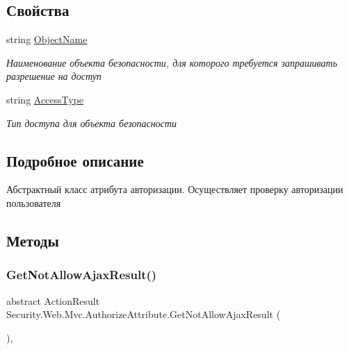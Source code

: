 \subsection*{Свойства}
\begin{DoxyCompactItemize}
\item 
string \hyperlink{class_security_1_1_web_1_1_mvc_1_1_authorize_attribute_a40d355c64a1d66cbab8b54f1fb67ad4f}{Object\+Name}
\begin{DoxyCompactList}\small\item\em Наименование объекта безопасности, для которого требуется запрашивать разрешение на доступ \end{DoxyCompactList}\item 
string \hyperlink{class_security_1_1_web_1_1_mvc_1_1_authorize_attribute_a7bc431c58d3c8410ba8d3e32972eca39}{Access\+Type}
\begin{DoxyCompactList}\small\item\em Тип доступа для объекта безопасности \end{DoxyCompactList}\end{DoxyCompactItemize}


\subsection{Подробное описание}
Абстрактный класс атрибута авторизации. Осуществляет проверку авторизации пользователя 



\subsection{Методы}
\mbox{\label{class_security_1_1_web_1_1_mvc_1_1_authorize_attribute_a380e0f412224bcd403e951faf3bae577}} 
\subsubsection{\texorpdfstring{Get\+Not\+Allow\+Ajax\+Result()}{GetNotAllowAjaxResult()}}
{\footnotesize\ttfamily abstract Action\+Result Security.\+Web.\+Mvc.\+Authorize\+Attribute.\+Get\+Not\+Allow\+Ajax\+Result (\begin{DoxyParamCaption}{ }\end{DoxyParamCaption})\hspace{0.3cm}{\ttfamily [protected]}, {}}



